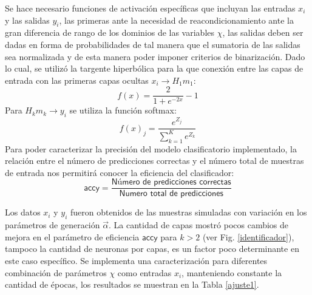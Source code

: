 Se hace necesario funciones de activación específicas que incluyan las entradas $x_i$ y las salidas $y_i$, las primeras ante la necesidad de reacondicionamiento ante la gran diferencia de rango de los dominios de las variables $\chi$, las salidas deben ser dadas en forma de probabilidades de tal manera que el sumatoria de las salidas sea normalizada y de esta manera poder imponer criterios de binarización. Dado lo cual, se utilizó la targente hiperbólica para la que conexión entre las capas de entrada con las primeras capas ocultas $x_i \longrightarrow H_1m_1$:
\begin{equation}
f(x)=\dfrac{2}{1+e^{-2x}}-1
\end{equation}
Para $H_km_k \longrightarrow y_i$ se utiliza la función softmax:
\begin{equation}
f(x)_j = \dfrac{e^{Z_j}}{\sum_{k=1}^{K}e^{Z_k}}
\end{equation}
Para poder caracterizar la precisión del modelo clasificatorio implementado, la relación entre el número de predicciones correctas y el número total de muestras de entrada nos permitirá conocer la eficiencia del clasificador:
\begin{equation}
\textsf{accy} =  \dfrac{\textsf{Número de predicciones correctas}}{\textsf{Numero total de predicciones}}
\end{equation}

Los datos $x_i$ y $y_i$ fueron obtenidos de las muestras simuladas con variación en los parámetros de generación $\vec{\alpha}$. La cantidad de capas mostró pocos cambios de mejora en el parámetro de eficiencia $\textsf{accy} $ para $k>2$ (ver Fig. \ref{identificador}), tampoco la cantidad de neuronas por capas, es un factor poco determinante en este caso específico. Se implementa una caracterización para diferentes combinación de parámetros $\chi$ como entradas $x_i$, manteniendo constante la cantidad de épocas, los resultados se muestran en la Tabla 
\ref{ajuste1}.

